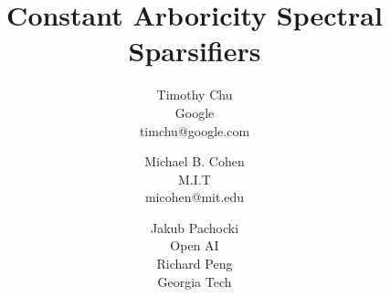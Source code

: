 

\title{Constant Arboricity Spectral Sparsifiers}
\author{
Timothy Chu
\\Google \\timchu@google.com
\and
Michael B. Cohen
\\M.I.T \\micohen@mit.edu
\and
Jakub Pachocki
\\Open AI \\ 
Richard Peng
\\Georgia Tech \\ 
}


  \maketitle
  
  
  
  
  
  
  
  


